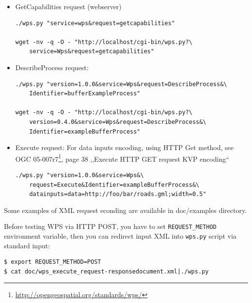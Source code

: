 \documentclass[a4paper,11pt]{article}
\newcommand{\pywpsDocCurrent}{OGC 05-007r7\footnote{\url{http://opengeospatial.org/standards/wps/}}}
\begin{document}
\begin{itemize}
    \item GetCapabilities request (webserver)
\begin{verbatim}
./wps.py "service=wps&request=getcapabilities"

wget -nv -q -O - "http://localhost/cgi-bin/wps.py?\
    service=Wps&request=getcapabilities"
\end{verbatim}
        
    \item DescribeProcess request:
\begin{verbatim}
./wps.py "version=1.0.0&service=Wps&request=DescribeProcess&\
    Identifier=bufferExampleProcess"

wget -nv -q -O - "http://localhost/cgi-bin/wps.py?\
    version=0.4.0&service=Wps&request=DescribeProcess&\
    Identifier=exampleBufferProcess"
\end{verbatim}
        
    \item Execute request:
            For data inputs encoding, using HTTP Get method, see
            \pywpsDocCurrent, page 38 ,,Execute HTTP GET request KVP
            encoding``
\begin{verbatim}
./wps.py "version=1.0.0&service=Wps&\
    request=Execute&Identifier=exampleBufferProcess&\
    datainputs=data=http://foo/bar/roads.gml;width=0.5"
\end{verbatim}
        
\end{itemize}


Some examples of XML request econding are available in doc/examples
directory.

Before testing WPS via HTTP POST, you have to set \texttt{REQUEST\_METHOD}
environment variable, then you can redirect input XML into \texttt{wps.py}
script via standard input:

\begin{verbatim}
$ export REQUEST_METHOD=POST
$ cat doc/wps_execute_request-responsedocument.xml|./wps.py
\end{verbatim}
\end{document}
